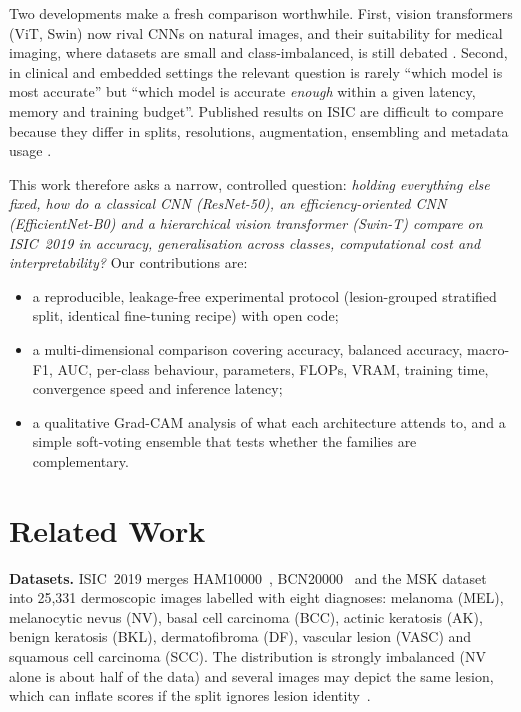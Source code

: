 \documentclass[conference]{IEEEtran}
\begin{document}
Two developments make a fresh comparison worthwhile. First, vision transformers (ViT, Swin)
\cite{dosovitskiy2021vit,liu2021swin} now rival CNNs on natural images, and their suitability for
medical imaging, where datasets are small and class-imbalanced, is still debated
\cite{matsoukas2021transformers}. Second, in clinical and embedded settings the relevant question
is rarely ``which model is most accurate'' but ``which model is accurate \emph{enough} within a
given latency, memory and training budget''. Published results on ISIC are difficult to compare
because they differ in splits, resolutions, augmentation, ensembling and metadata usage
\cite{cassidy2022isic}.

This work therefore asks a narrow, controlled question: \emph{holding everything else fixed, how
do a classical CNN (ResNet-50), an efficiency-oriented CNN (EfficientNet-B0) and a hierarchical
vision transformer (Swin-T) compare on ISIC~2019 in accuracy, generalisation across classes,
computational cost and interpretability?} Our contributions are:
\begin{itemize}
  \item a reproducible, leakage-free experimental protocol (lesion-grouped stratified split,
        identical fine-tuning recipe) with open code;
  \item a multi-dimensional comparison covering accuracy, balanced accuracy, macro-F1, AUC,
        per-class behaviour, parameters, FLOPs, VRAM, training time, convergence speed and
        inference latency;
  \item a qualitative Grad-CAM analysis of what each architecture attends to, and a simple
        soft-voting ensemble that tests whether the families are complementary.
\end{itemize}

\section{Related Work}
\textbf{Datasets.} ISIC~2019 merges HAM10000~\cite{tschandl2018ham10000},
BCN20000~\cite{combalia2019bcn20000} and the MSK dataset into 25,331 dermoscopic images labelled
with eight diagnoses: melanoma (MEL), melanocytic nevus (NV), basal cell carcinoma (BCC), actinic
keratosis (AK), benign keratosis (BKL), dermatofibroma (DF), vascular lesion (VASC) and squamous
cell carcinoma (SCC). The distribution is strongly imbalanced (NV alone is about half of the
data) and several images may depict the same lesion, which can inflate scores if the split ignores
lesion identity~\cite{cassidy2022isic}.
\end{document}
